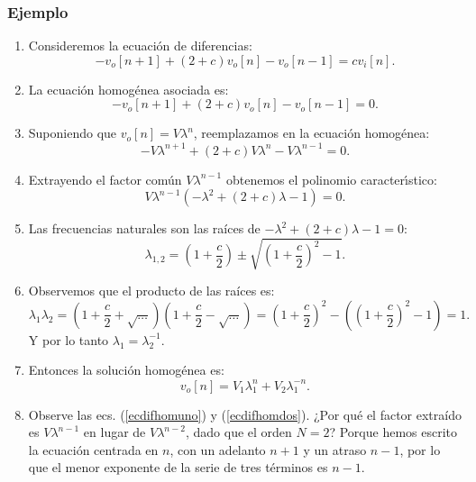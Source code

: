 \subsubsection{Ejemplo}

\begin{enumerate}
	\item Consideremos la ecuaci\'{o}n de diferencias:
	\begin{equation}
		-v_{o}[n+1] + (2+c) v_{o}[n] - v_{o}[n-1] = c v_{i}[n].
	\end{equation}
	
	\item La ecuaci\'{o}n homog\'{e}nea asociada es:
	\begin{equation}
		-v_{o}[n+1] + (2+c) v_{o}[n] - v_{o}[n-1] = 0.
	\end{equation}
	
	\item Suponiendo que $v_{o}[n] = V \lambda^{n}$, reemplazamos en la ecuaci\'{o}n homog\'{e}nea:
	\begin{equation}
		-V \lambda^{n+1} + (2 + c) V \lambda^{n} - V \lambda^{n-1} = 0. \label{ecdifhomuno}
	\end{equation}
	
	\item Extrayendo el factor com\'{u}n $V \lambda^{n-1}$ obtenemos el polinomio caracter\'{\i}stico:
	\begin{equation}
		V \lambda^{n-1} (-\lambda^{2} + (2 + c) \lambda - 1) = 0. \label{ecdifhomdos}
	\end{equation}
	
	\item Las frecuencias naturales son las raíces de $-\lambda^{2} + (2 + c) \lambda - 1 = 0$:
	\begin{equation}
		\lambda_{1,2} = \left( 1+\frac{c}{2}\right) \pm \sqrt{\left( 1+\frac{c}{2}\right)^{2}-1}.
	\end{equation}
	
	\item Observemos que el producto de las raíces es:
	\begin{equation}
		\lambda_1 \lambda_2 = \left( 1+\frac{c}{2} + \sqrt{\dots} \right) \left( 1+\frac{c}{2} - \sqrt{\dots} \right) = \left( 1+\frac{c}{2}\right)^2 - \left(\left( 1+\frac{c}{2}\right)^2 - 1\right) = 1.
	\end{equation}
	Y por lo tanto $\lambda_{1} = \lambda_{2}^{-1}$.
	
	\item Entonces la soluci\'{o}n homog\'{e}nea es:
	\begin{equation}
		v_{o}[n] = V_{1} \lambda_{1}^n + V_{2} \lambda_{1}^{-n}.
	\end{equation}
	
	\item Observe las ecs. (\ref{ecdifhomuno}) y (\ref{ecdifhomdos}). ¿Por qué el factor extraído es $V \lambda^{n-1}$ en lugar de $V \lambda^{n-2}$, dado que el orden $N=2$? Porque hemos escrito la ecuación centrada en $n$, con un adelanto $n+1$ y un atraso $n-1$, por lo que el menor exponente de la serie de tres términos es $n-1$.
\end{enumerate}

